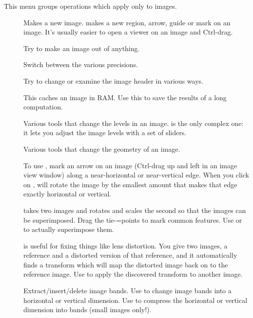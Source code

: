 This menu groups operations which apply only to images.

\begin{description}

\item[]
	Makes a new image.  makes a new region, arrow,
	guide or mark on an image. It's usually easier to open a viewer on
	an image and Ctrl-drag.

\item[]
	Try to make an image out of anything.

\item[]
	Switch between the various precisions.

\item[]
	Try to change or examine the image header in various ways.

\item[]
	This caches an image in RAM. Use this to save the results of a long
	computation.

\item[]
	Various tools that change the levels in an image.  is
	the only complex one: it lets you adjust the image levels with a set
	of sliders.

\item[]
	Various tools that change the geometry of an image. 

	To use , mark an arrow on an image
	(Ctrl-drag up and left in an image view window) along a
	near-horizontal or near-vertical edge. When you click on
	, \nip{} will rotate the image by the
	smallest amount that makes that edge exactly horizontal or vertical.

	 takes two images and rotates and scales
	the second so that the images can be superimposed. Drag the
	tie-=points to mark common features. Use 
	or  to actually superimpose them.

	 is useful for fixing things like lens distortion.
	You give  two images, a reference and a distorted version
	of that reference, and it automatically finds a transform which
	will map the distorted image back on to the reference image. Use
	 to apply the discovered transform to another image.

\item[]
	Extract/insert/delete image bands. Use  to change
	image bands into a horizontal or vertical dimension. Use  to compress the horizontal or vertical dimension into bands
	(small images only!).


\end{description}
